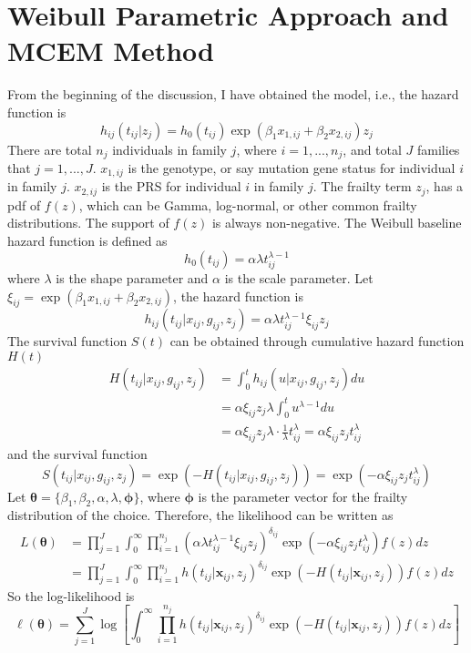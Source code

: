 \documentclass[preprint,12pt]{elsarticle}
\begin{document}
\section{Weibull Parametric Approach and MCEM Method}
From the beginning of the discussion, I have obtained the model, i.e., the hazard function is
\begin{equation}
    h_{ij}(t_{ij}|z_j)=h_0(t_{ij})\exp(\beta_1x_{1,ij}+\beta_2 x_{2,ij})z_j
\end{equation}
There are total $n_j$ individuals in family $j$, where $i=1,...,n_j$, and total $J$ families that $j=1,...,J$. $x_{1,ij}$ is the genotype, or say mutation gene status for individual $i$ in family $j$. $x_{2,ij}$
is the PRS for individual $i$ in family $j$. The frailty term $z_j$, has a pdf of $f(z)$, which can be Gamma, log-normal, or other common frailty distributions.
The support of $f(z)$ is always non-negative. The Weibull baseline hazard function is defined as
\begin{equation}
    h_0(t_{ij})=\alpha\lambda t_{ij}^{\lambda-1}
\end{equation}
where $\lambda$ is the shape parameter and $\alpha$ is the scale parameter. Let $\xi_{ij}=\exp(\beta_1 x_{1,ij}+\beta_2 x_{2,ij})$, the hazard function is 
\begin{equation}
    h_{ij}(t_{ij}|x_{ij}, g_{ij}, z_j)=\alpha\lambda t_{ij}^{\lambda-1}\xi_{ij}z_j
\end{equation}
The survival function $S(t)$ can be obtained through cumulative hazard function $H(t)$
\begin{align}
    H(t_{ij}|x_{ij}, g_{ij}, z_j)&=\int_0^{t}h_{ij}(u|x_{ij}, g_{ij}, z_j)du\\
    &=\alpha\xi_{ij}z_j\lambda\int_0^t u^{\lambda-1}du\\
    &=\alpha\xi_{ij}z_j\lambda\cdot \frac{1}{\lambda} t_{ij}^{\lambda}=\alpha\xi_{ij}z_j t_{ij}^{\lambda}
\end{align}
and the survival function
\begin{equation}
    S(t_{ij}|x_{ij}, g_{ij}, z_j)=\exp(-H(t_{ij}|x_{ij}, g_{ij}, z_j))=\exp(-\alpha\xi_{ij}z_j t_{ij}^{\lambda})
\end{equation}
Let $\boldsymbol{\theta}=\{\beta_1, \beta_2, \alpha, \lambda, \boldsymbol{\phi}\}$, where $\boldsymbol{\phi}$ is the parameter vector for the frailty distribution of the choice. Therefore, the likelihood can be written as
\begin{align}
    L(\boldsymbol{\theta})&=\prod_{j=1}^J\int_0^{\infty}\prod_{i=1}^{n_j}(\alpha\lambda t_{ij}^{\lambda-1}\xi_{ij}z_j)^{\delta_{ij}}\exp(-\alpha\xi_{ij}z_j t_{ij}^{\lambda})f(z)dz\\
    &=\prod_{j=1}^J\int_0^{\infty}\prod_{i=1}^{n_j}h(t_{ij}|\mathbf{x}_{ij},z_j)^{\delta_{ij}}\exp(-H(t_{ij}|\mathbf{x}_{ij},z_j))f(z)dz
\end{align}
So the log-likelihood is 
\begin{equation}\label{eq:logllhd}
    \ell(\boldsymbol{\theta})=\sum_{j=1}^J\log \left [ \int_0^{\infty}\prod_{i=1}^{n_j}h(t_{ij}|\mathbf{x}_{ij}, z_j)^{\delta_{ij}}\exp (-H(t_{ij}|\mathbf{x}_{ij}, z_j))f(z)dz\right ]
\end{equation}
\end{document}
